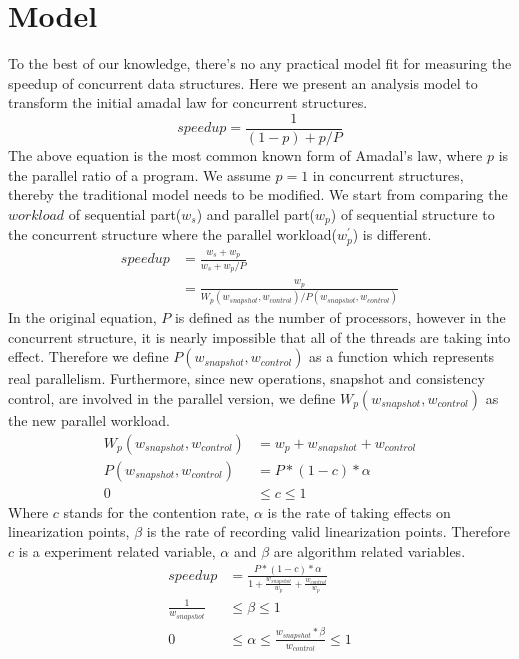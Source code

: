 \documentclass{article}
\begin{document}
\section{Model}
To the best of our knowledge, there's no any practical model fit for measuring the speedup of concurrent data structures. Here we present an analysis model to transform the initial amadal law for concurrent structures. 
\begin{equation*}
    speedup = \frac{1}{(1-p)+p/P}
\end{equation*}
The above equation is the most common known form of Amadal's law, where $p$ is the parallel ratio of a program. We assume $p = 1$ in concurrent structures, thereby the traditional model needs to be modified. We start from comparing the $workload$ of sequential part($w_{s}$) and parallel part($w_{p}$) of sequential structure to the concurrent structure where the parallel workload($w_{p}^{'}$) is different. 
\begin{equation*}
\begin{split}
speedup & = \frac{w_{s} + w_{p}}{w_{s} + w_{p} / P} \\
 & = \frac{w_{p}}{W_{p}(w_{snapshot}, w_{control}) / P(w_{snapshot}, w_{control})}
\end{split}
\end{equation*}
In the original equation, $P$ is defined as the number of processors, however in the concurrent structure, it is nearly impossible that all of the threads are taking into effect. Therefore we define $P(w_{snapshot}, w_{control})$ as a function which represents real parallelism. Furthermore, since new operations, snapshot and consistency control, are involved in the parallel version, we define $W_{p}(w_{snapshot}, w_{control})$ as the new parallel workload.
\begin{equation*}
\begin{split}
W_{p}(w_{snapshot}, w_{control}) &= w_{p} + w_{snapshot} + w_{control}\\
P(w_{snapshot}, w_{control}) &=P * (1 - c) * \alpha\\
0 &\leq c \leq 1
\end{split}
\end{equation*}
Where $c$ stands for the contention rate, $\alpha$ is the rate of taking effects on linearization points, $\beta$ is the rate of recording valid linearization points. Therefore $c$ is a experiment related variable, $\alpha$ and $\beta$ are algorithm related variables.
\begin{equation*}
\begin{split}
speedup &= \frac{P*(1-c)*\alpha}{1+\frac{w_{snapshot}}{w_{p}}+\frac{w_{control}}{w_{p}}}\\
\frac{1}{w_{snapshot}} &\leq \beta \leq 1\\
0 &\leq \alpha \leq \frac{w_{snapshot} * \beta}{w_{control}} \leq 1\\
\end{split}
\end{equation*}
\end{document}
